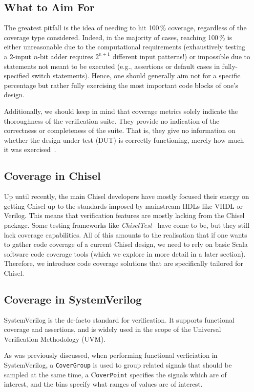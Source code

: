 \documentclass[runningheads]{llncs}
\begin{document}
\subsection{What to Aim For}

The greatest pitfall is the idea of needing to hit 100\,\% coverage, regardless of the coverage type considered. Indeed, in the majority of cases, reaching 100\,\% is either unreasonable due to the computational requirements (exhaustively testing a 2-input $n$-bit adder requires $2^{n+1}$ different input patterns!) or impossible due to statements not meant to be executed (e.g., assertions or default cases in fully-specified switch statements). Hence, one should generally aim not for a specific percentage but rather fully exercising the most important code blocks of one's design.

Additionally, we should keep in mind that coverage metrics solely indicate the thoroughness of the verification suite. They provide no indication of the correctness or completeness of the suite. That is, they give no information on whether the design under test (DUT) is correctly functioning, merely how much it was exercised~\cite{hdlverify}.

\subsection{Coverage in Chisel} Up until recently, the main Chisel developers have mostly focused their energy on getting Chisel up to the standards imposed by mainstream HDLs like VHDL or Verilog. This means that verification features are mostly lacking from the Chisel package. Some testing frameworks like \textit{ChiselTest}~\cite{chisel:tester2} have come to be, but they still lack coverage capabilities. All of this amounts to the realisation that if one wants to gather code coverage of a current Chisel design, we need to rely on basic Scala software code coverage tools (which we explore in more detail in a later section). Therefore, we introduce code coverage solutions that are specifically tailored for Chisel.

\subsection{Coverage in SystemVerilog}
SystemVerilog is the de-facto standard for verification. It supports functional coverage and assertions, and is widely used in the scope of the Universal Verification Methodology (UVM). 

As was previously discussed, when performing functional verficiation in SystemVerilog, a \texttt{CoverGroup} is used to group related signals that should be sampled at the same time, a C\texttt{overPoint} specifies the signals which are of interest, and the bins specify what ranges of values are of interest.
\end{document}
